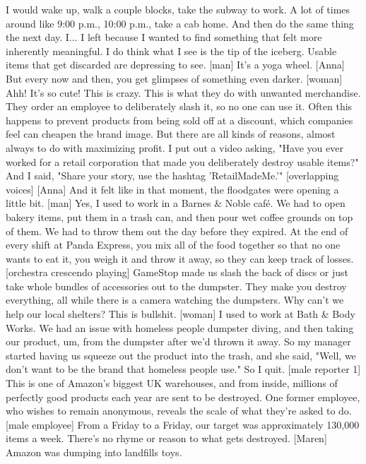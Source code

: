 \documentclass[a4paper]{article}
\begin{document}
	I would wake up, walk a couple blocks, take the subway to work.
	A lot of times around like 9:00 p.m., 10:00 p.m.,
	take a cab home.
	And then do the same thing the next day.
	I... I left because
	I wanted to find something that felt more inherently meaningful.
	I do think what I see is the tip of the iceberg.
	Usable items that get discarded are depressing to see.
	[man] It's a yoga wheel.
	[Anna] But every now and then, you get glimpses of something even darker.
	[woman] Ahh! It's so cute!
	This is crazy.
	This is what they do with unwanted merchandise.
	They order an employee to deliberately slash it,
	so no one can use it.
	Often this happens to prevent products from being sold off at a discount,
	which companies feel can cheapen the brand image.
	But there are all kinds of reasons,
	almost always to do with maximizing profit.
	I put out a video
	asking, "Have you ever worked for a retail corporation
	that made you deliberately destroy usable items?"
	And I said, "Share your story, use the hashtag 'RetailMadeMe.'"
	[overlapping voices]
	[Anna] And it felt like in that moment, the floodgates were opening a little bit.
	[man] Yes, I used to work in a Barnes \& Noble café.
	We had to open bakery items,
	put them in a trash can,
	and then pour wet coffee grounds on top of them.
	We had to throw them out the day before they expired.
	At the end of every shift at Panda Express,
	you mix all of the food together so that no one wants to eat it,
	you weigh it and throw it away,
	so they can keep track of losses.
	[orchestra crescendo playing]
	GameStop made us slash the back of discs
	or just take whole bundles of accessories out to the dumpster.
	They make you destroy everything,
	all while there is a camera watching the dumpsters.
	Why can't we help our local shelters? This is bullshit.
	[woman] I used to work at Bath \& Body Works.
	We had an issue with homeless people dumpster diving,
	and then taking our product,
	um, from the dumpster after we'd thrown it away.
	So my manager started having us
	squeeze out the product into the trash,
	and she said, "Well, we don't want to be the brand that homeless people use."
	So I quit.
	[male reporter 1] This is one of Amazon's biggest UK warehouses,
	and from inside, millions of perfectly good products each year
	are sent to be destroyed.
	One former employee, who wishes to remain anonymous,
	reveals the scale
	of what they're asked to do.
	[male employee] From a Friday to a Friday,
	our target was approximately 130,000 items a week.
	There's no rhyme or reason to what gets destroyed.
	[Maren] Amazon was dumping
	into landfills toys.
\end{document}
